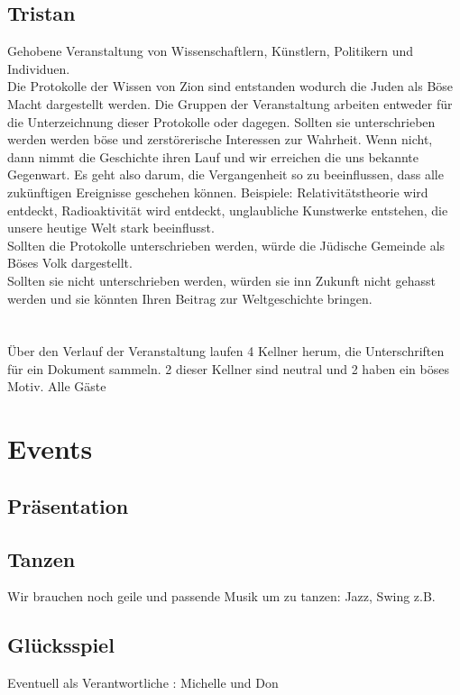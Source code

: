 \documentclass[12pt, a4paper, openany]{report}
\begin{document}
\section{Tristan}
Gehobene Veranstaltung von Wissenschaftlern, Künstlern, Politikern und Individuen.\\
Die Protokolle der Wissen von Zion sind entstanden wodurch die Juden als Böse Macht dargestellt werden. 
Die Gruppen der Veranstaltung arbeiten entweder für die Unterzeichnung dieser Protokolle oder dagegen.
Sollten sie unterschrieben werden werden böse und zerstörerische Interessen zur Wahrheit.
Wenn nicht, dann nimmt die Geschichte ihren Lauf und wir erreichen die uns bekannte Gegenwart.
Es geht also darum, die Vergangenheit so zu beeinflussen, dass alle zukünftigen Ereignisse geschehen können.
Beispiele: Relativitätstheorie wird entdeckt, Radioaktivität wird entdeckt, unglaubliche Kunstwerke entstehen, die unsere heutige Welt stark beeinflusst.\\
Sollten die Protokolle unterschrieben werden, würde die Jüdische Gemeinde als Böses Volk dargestellt.\\
Sollten sie nicht unterschrieben werden, würden sie inn Zukunft nicht gehasst werden und sie könnten Ihren Beitrag zur Weltgeschichte bringen.\\\\\\
Über den Verlauf der Veranstaltung laufen 4 Kellner herum, die Unterschriften für ein Dokument sammeln. 2 dieser Kellner sind neutral und 2 haben ein böses Motiv.
Alle Gäste


\chapter{Events}
\section{Präsentation}
\section{Tanzen}
Wir brauchen noch geile und passende Musik um zu tanzen:
Jazz, Swing z.B.

\section{Glücksspiel}
Eventuell als Verantwortliche : Michelle und Don
\end{document}
